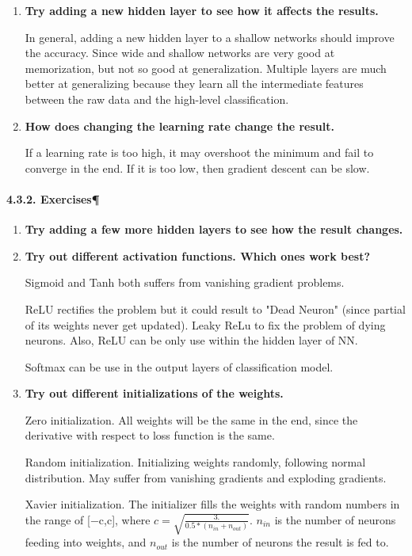 \documentclass[11pt]{article}
\begin{document}
\begin{enumerate}
\def\labelenumi{\arabic{enumi}.}
\setcounter{enumi}{1}
\item
  \textbf{Try adding a new hidden layer to see how it affects the
  results.}

  In general, adding a new hidden layer to a shallow networks should
  improve the accuracy. Since wide and shallow networks are very good at
  memorization, but not so good at generalization. Multiple layers are
  much better at generalizing because they learn all the intermediate
  features between the raw data and the high-level classification.
\item
  \textbf{How does changing the learning rate change the result.}

  If a learning rate is too high, it may overshoot the minimum and fail
  to converge in the end. If it is too low, then gradient descent can be
  slow.
\end{enumerate}

    \paragraph{4.3.2. Exercises¶}\label{exercises}

\begin{enumerate}
\def\labelenumi{\arabic{enumi}.}
\item
  \textbf{Try adding a few more hidden layers to see how the result
  changes.}
\item
  \textbf{Try out different activation functions. Which ones work best?}

  Sigmoid and Tanh both suffers from vanishing gradient problems.

  ReLU rectifies the problem but it could result to "Dead Neuron" (since
  partial of its weights never get updated). Leaky ReLu to fix the
  problem of dying neurons. Also, ReLU can be only use within the hidden
  layer of NN.

  Softmax can be use in the output layers of classification model.
\item
  \textbf{Try out different initializations of the weights.}

  Zero initialization. All weights will be the same in the end, since
  the derivative with respect to loss function is the same.

  Random initialization. Initializing weights randomly, following normal
  distribution. May suffer from vanishing gradients and exploding
  gradients.

  Xavier initialization. The initializer fills the weights with random
  numbers in the range of {[}−c,c{]}, where
  \(c = \sqrt{\frac{3.}{0.5 * (n_{in} + n_{out})}}\). \(n_{in}\) is the
  number of neurons feeding into weights, and \(n_{out}\) is the number
  of neurons the result is fed to.
\end{enumerate}
\end{document}
